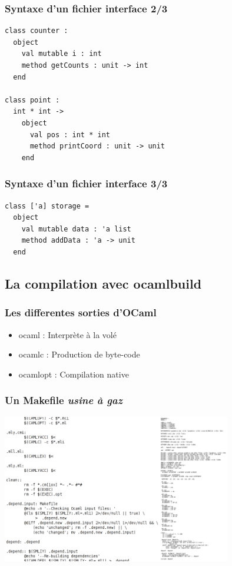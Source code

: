\begin{frame}[fragile]
	\frametitle{Syntaxe d'un fichier interface 2/3}
	\lstset{basicstyle=\small}
	\begin{lstlisting}
class counter :
  object
    val mutable i : int
    method getCounts : unit -> int
  end

class point :
  int * int -> 
    object
      val pos : int * int
      method printCoord : unit -> unit
    end
	\end{lstlisting}
\end{frame}

\begin{frame}[fragile]
	\frametitle{Syntaxe d'un fichier interface 3/3}
	\lstset{basicstyle=\small}
	\begin{lstlisting}
class ['a] storage = 
  object 
    val mutable data : 'a list
    method addData : 'a -> unit 
  end
	\end{lstlisting}
\end{frame}

\subsection{La compilation avec ocamlbuild} %
\begin{frame}[fragile]
	\frametitle{Les differentes sorties d'OCaml}
	\huge
	\begin{itemize}
		\item ocaml : Interprète à la volé
		\item ocamlc : Production de byte-code
		\item ocamlopt : Compilation native
	\end{itemize}
	\normalsize
\end{frame}

\begin{frame}
	\frametitle{Un Makefile \textit{usine à gaz}}
	\begin{center}
		\includegraphics[width=10cm]{pics/mkfile.png}
	\end{center}
\end{frame}

